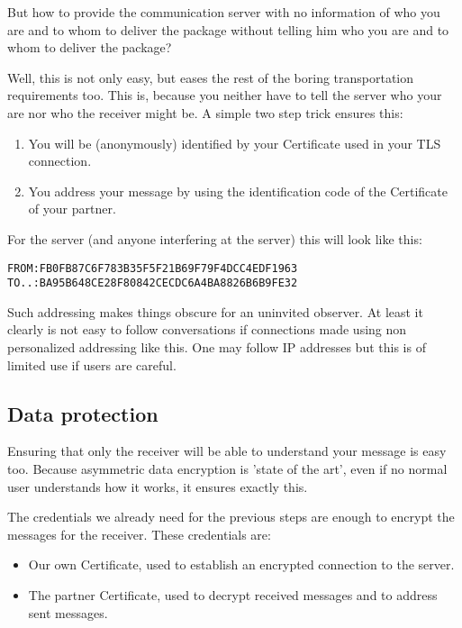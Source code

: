 \documentclass[twoside,a4paper,english,12pt,authoryear,openright]{book}
\begin{document}
But how to provide the communication server with no information of who you are and to whom to deliver the package without telling him who you are and to whom to deliver the package?

Well, this is not only easy, but eases the rest of the boring transportation requirements too. This is, because you neither have to tell the server who your are nor who the receiver might be. A simple two step trick ensures this:

\begin{enumerate}
\item{You will be (anonymously) identified by your Certificate used in your TLS connection.}
\item{You address your message by using the identification code of the Certificate of your partner.}
\end{enumerate}

For the server (and anyone interfering at the server) this will look like this:

\begin{lstlisting}
FROM:FB0FB87C6F783B35F5F21B69F79F4DCC4EDF1963
TO..:BA95B648CE28F80842CECDC6A4BA8826B6B9FE32
\end{lstlisting}

Such addressing makes things obscure for an uninvited observer. At least it clearly is not easy to follow conversations if connections made using non personalized addressing like this. One may follow IP addresses but this is of limited use if users are careful.


\subsection{Data protection}

Ensuring that only the receiver will be able to understand your message is easy too. Because asymmetric data encryption is 'state of the art', even if no normal user understands how it works, it ensures exactly this.

The credentials we already need for the previous steps are enough to encrypt the messages for the receiver. These credentials are:

\begin{itemize}
\item{Our own Certificate, used to establish an encrypted connection to the server.}
\item{The partner Certificate, used to decrypt received messages and to address sent messages.}
\end{itemize}
\end{document}
